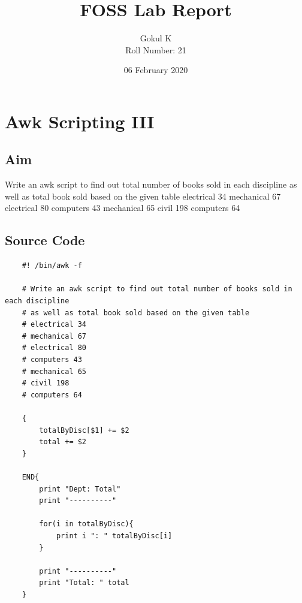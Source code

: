 \documentclass{article}
\begin{document}
\title{FOSS Lab Report}
\author{Gokul K\\[2\baselineskip]
Roll Number: 21\\[2\baselineskip]}
\date{06 February 2020}

\maketitle

\setcounter{section}{21}
\section{Awk Scripting III}
\subsection{Aim}

Write an awk script to find out total number of books sold in each discipline
 as well as total book sold based on the given table\newline
electrical 34\newline
mechanical 67\newline
electrical 80\newline
computers 43\newline
mechanical 65\newline
civil 198\newline
computers 64\newline

\subsection{Source Code}
\begin{verbatim}
    #! /bin/awk -f

    # Write an awk script to find out total number of books sold in each discipline
    # as well as total book sold based on the given table
    # electrical 34
    # mechanical 67
    # electrical 80
    # computers 43
    # mechanical 65
    # civil 198
    # computers 64
    
    {
        totalByDisc[$1] += $2
        total += $2
    }
    
    END{
        print "Dept: Total"
        print "----------"
    
        for(i in totalByDisc){
            print i ": " totalByDisc[i]
        }
    
        print "----------"
        print "Total: " total
    }
\end{verbatim}
\end{document}

